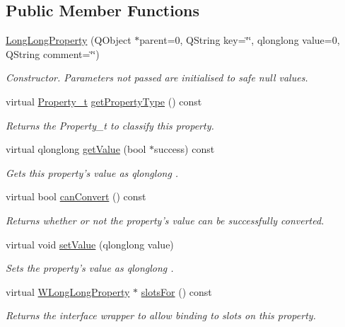 \subsection*{Public Member Functions}
\begin{DoxyCompactItemize}
\item 
\hyperlink{class_long_long_property_af3527fb08c50e565e669966774ad1254}{Long\-Long\-Property} (Q\-Object $\ast$parent=0, Q\-String key=\char`\"{}\char`\"{}, qlonglong value=0, Q\-String comment=\char`\"{}\char`\"{})
\begin{DoxyCompactList}\small\item\em Constructor. Parameters not passed are initialised to safe null values. \end{DoxyCompactList}\item 
virtual \hyperlink{group___property_classes_ga38f1ccddda12c7cb50b868c9f789ee37}{Property\-\_\-t} \hyperlink{class_long_long_property_aef541867fa0047705e5ceb968da5073d}{get\-Property\-Type} () const 
\begin{DoxyCompactList}\small\item\em Returns the Property\-\_\-t to classify this property. \end{DoxyCompactList}\item 
virtual qlonglong \hyperlink{class_long_long_property_a55da84c1e1c5db5431a3b5ddae6a72eb}{get\-Value} (bool $\ast$success) const 
\begin{DoxyCompactList}\small\item\em Gets this property's value as qlonglong . \end{DoxyCompactList}\item 
virtual bool \hyperlink{class_long_long_property_a2690f56d6b804d37eec1457250da4acb}{can\-Convert} () const 
\begin{DoxyCompactList}\small\item\em Returns whether or not the property's value can be successfully converted. \end{DoxyCompactList}\item 
virtual void \hyperlink{class_long_long_property_abff074961b681f08072260664b0221f6}{set\-Value} (qlonglong value)
\begin{DoxyCompactList}\small\item\em Sets the property's value as qlonglong . \end{DoxyCompactList}\item 
virtual \hyperlink{class_w_long_long_property}{W\-Long\-Long\-Property} $\ast$ \hyperlink{class_long_long_property_a1a835b6e035572c098c27b21931c3d7f}{slots\-For} () const 
\begin{DoxyCompactList}\small\item\em Returns the interface wrapper to allow binding to slots on this property. \end{DoxyCompactList}\end{DoxyCompactItemize}

